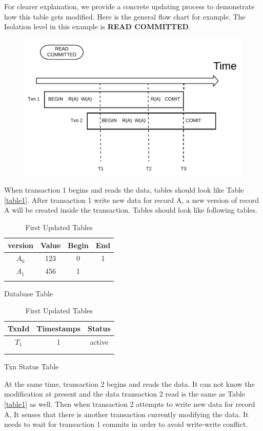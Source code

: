For clearer explanation, we provide a concrete updating process to demonstrate how this table gets modified. Here is the general flow chart for example. The Isolation level in this example is \textbf{READ COMMITTED}.
\begin{figure}[H]
	\centering
	\includegraphics[scale=0.36]{demo1.png}
\end{figure}
When transaction 1 begins and reads the data, tables should look like Table \ref{table1}. After transaction 1 write new data for record A, a new version of record A will be created inside the transaction. Tables should look like following tables.
\begin{table}[H]
	\parbox{.45\linewidth}{
		\centering
		\begin{tabular}{|c|c|c|c|}
			\hline
			version&Value&Begin&End\\\hline
			$A_0$&123&0&1 \\\hline
			$A_1$&456&1& \\\hline
			&&&\\\hline
		\end{tabular}
		\caption*{Database Table}
	}
	\hfill
	\parbox{.45\linewidth}{
		\begin{tabular}{|c|c|c|}
			\hline
			TxnId&Timestamps&Status\\\hline
			$T_1$&1&active \\\hline
			&&\\\hline
			&&\\\hline
		\end{tabular}
		\caption*{Txn Status Table}
	}
	\caption{First Updated Tables\label{table2}}
\end{table}
At the same time, transaction 2 begins and reads the data. It can not know the modification at present and the data transaction 2 read is the same as Table \ref{table1} as well. Then when transaction 2 attempts to write new data for record A, It senses that there is another transaction currently modifying the data. It needs to wait for transaction 1 commits in order to avoid write-write conflict.\\


